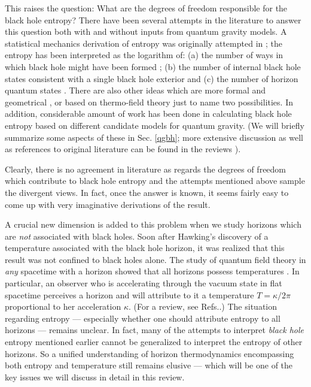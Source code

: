 \documentclass[12pt]{iopart}
\begin{document}
This raises the  question: What are the degrees of freedom responsible for the black hole entropy? 
There have been several attempts in  the literature to answer this question  both with and  without inputs from quantum gravity models.
 A statistical mechanics derivation of entropy was originally attempted in \cite{Gerlach:1976hbh};
 the entropy  has been interpreted as the logarithm of: (a)  the number of 
      ways in which black hole might have been formed \cite{Bekenstein:1973ur,Hawking:1976de};
     (b) the number of internal black hole states consistent with a 
      single black hole  exterior  \cite{Bekenstein:1975tw} and
     (c)  the number of horizon quantum states \cite{wheeler,'tHooft:1990fr,Susskind:1993if}.
      There are also  other ideas which are more formal and geometrical \cite{Jacobson:1994vj,Visser:1993nu,Banados:1994qp,Susskind:1993ws},
       or  based on thermo-field theory \cite{Frolov:1998vs,Frolov:1997up,Frolov:1997aj}
       just to name two possibilities.
      In addition, considerable amount of work has been done
in calculating black hole entropy based on different candidate models for quantum gravity. 
(We will briefly summarize some aspects of these  in Sec. \ref{qgbh};
more extensive discussion as well as references to original literature can be found in the reviews \cite{Rovelli:1998yv,Das:2000su}).

Clearly, there is no agreement in literature as regards the degrees of freedom which contribute
to black hole entropy and the  attempts mentioned above   sample the divergent views.  In fact, once the answer is known, it seems fairly easy to come up with very imaginative derivations
of the result. 
 
 A crucial new dimension is added to this problem when we study horizons  which are \textit{not} associated with black holes. Soon after Hawking's discovery of a temperature associated with the black hole horizon, it was 
realized that this result was not confined to black holes alone. The study of quantum field theory in \textit{any} spacetime with a horizon showed that all horizons possess  temperatures \cite{Fulling:1973md,Davies:1975th,PIdesitter}.
In particular, an observer who is accelerating through the vacuum state in flat spacetime perceives a horizon and will attribute to it \cite{Unruh:1976db} a temperature $T= \kappa / 2\pi$ proportional to her acceleration $\kappa$.
(For a review, see Refs.\cite{Birrel:bkqft,mukhanovwini,Dewitt:1975ys,Takagi:1986kn,Sriramkumar:1999nw,Brout:1995rd,Wald:1999vt}.)
The situation regarding entropy --- especially whether one should attribute entropy to all horizons --- remains  unclear. In fact, many of the attempts    to interpret \textit{black hole} entropy mentioned earlier cannot be generalized to interpret the entropy of other horizons. So a unified understanding of horizon thermodynamics encompassing both entropy  and temperature still remains elusive --- which will be one of the key issues we will  discuss in detail in this review.
\end{document}
